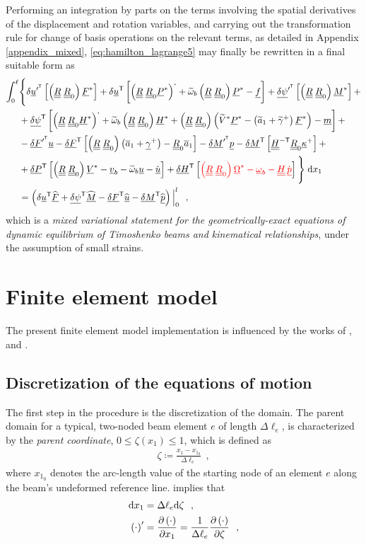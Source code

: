 \documentclass[12pt,a4paper,oneside,english]{abntex2} %
\newcommand{\fix}[1]{{\color{red}#1}}
\newcommand{\vect}[1]{\underline{#1}}
\newcommand{\uvec}[1]{\overline{#1}}
\newcommand{\del}[2]{\frac{\partial#1}{\partial#2}}
\def\tens#1{\underline{\underline{#1}}}
\def\til#1{\widetilde{#1}}
\def\lb{\left[}
\def\rb{\right]}
\def\lp{\left(}
\def\rp{\right)}
\def\T{\mathsf{T}}
\def\xo{x_1}
\def\aone{\uvec{a}_1}
\def\aonetil{\til{a}_1}
\def\dotout{^{\boldsymbol{\cdot}}}
\def\R{\tens{R}}
\def\Rz{\R_0}
\def\u{\vect{u}}
\def\uT{\u^\T}
\def\udot{\dot{\u}}
\def\uprimeT{\u^{\prime^\T}}
\def\uhat{\widehat{\u}}
\def\vb{\vect{v}_b}
\def\om{\vect{\omega}_b}
\def\omtil{\til{\omega}_b}
\def\gam{\vect{\gamma}}
\def\gamp{\gam^{+}}
\def\gamptil{\til{\gamma}^{+}}
\def\kap{\vect{\kappa}}
\def\kapp{\kap^{+}}
\def\V{\vect{V}}
\def\Vs{\V^{*}}
\def\Vtils{\til{V}^{*}}
\def\Om{\vect{\Omega}}
\def\Oms{\Om^{*}}
\def\P{\vect{P}}
\def\Ps{\P^*}
\def\Hv{\vect{H}}
\def\Hvs{\Hv^*}
\def\H{\tens{H}}
\def\HinvT{\H^{-\T}}
\def\p{\vect{p}}
\def\pdot{\dot{\p}}
\def\phat{\widehat{\p}}
\def\F{\vect{F}}
\def\Fhat{\widehat{\F}}
\def\Fs{\F^*}
\def\M{\vect{M}}
\def\Mhat{\widehat{\M}}
\def\Ms{\M^*}
\def\f{\vect{f}}
\def\m{\vect{m}}
\def\delF{\vect{\delta F}}
\def\delFT{\delF^\T}
\def\delFpT{\delF^{\prime^\T}}
\def\delM{\vect{\delta M}}
\def\delMT{\delM^\T}
\def\delMpT{\delM^{\prime^\T}}
\def\delP{\vect{\delta P}}
\def\delPT{\delP^\T}
\def\delH{\vect{\delta H}}
\def\delHT{\delH^\T}
\def\delpsi{\vect{\delta\psi}}
\def\delpsiT{\delpsi^\T}
\def\delpsipT{\delpsi^{\prime^\T}}
\def\Deltal{\Delta \ell_e}
\def\Deltalinv{\frac{1}{\Deltal}}
\def\intl{\int_{0}^{\ell}}
\def\d{\textnormal{d}}
\def\RRz{\lp\R\;\Rz\rp}
\def\xoz{x_{1_0}}
\begin{document}
Performing an integration by parts on the terms involving the spatial derivatives of the displacement and rotation variables, and carrying out the transformation rule for change of basis operations on the relevant terms, as detailed in Appendix \ref{appendix_mixed}, \cref{eq:hamilton_lagrange5} may finally be rewritten in a final suitable form as
\begin{align}
	\intl &\Biggl\{\Biggr. \delta\uprimeT\lb\RRz\Fs\rb + \delta\uT\lb\lp\R\;\Rz\Ps\rp\dotout+\omtil\RRz\Ps-\f\rb + \delpsipT\lb\RRz\Ms\rb +
	\nonumber \\	&+\delpsiT\lb\lp\R\;\Rz\Hvs\rp\dotout+\omtil\RRz\Hvs+\RRz\lp\Vtils\Ps-\lp\aonetil+\gamptil\rp\Fs\rp-\m\rb + \nonumber \\
	&-\delFpT\u -\delFT\lb\RRz\lp\aone+\gamp\rp-\Rz\aone\rb - \delMpT\p -\delMT\lb\HinvT\Rz\kapp\rb +
	\nonumber \\
	&+\delPT\lb\RRz\Vs-\vb-\omtil\u-\udot\rb + \delHT\lb\fix{\RRz\Oms-\om-\H\,\pdot}\rb
	\Biggl.\Biggr\}\;\d \xo \nonumber \\
	&=\lp \delta\uT\Fhat+\delpsiT\Mhat-\delFT\uhat-\delMT\phat \rp\Big|_{0}^{l} \ \ ,
    \label{eq:hamilton_lagrange6}
\end{align}
which is a \textit{mixed variational statement for the geometrically-exact equations of dynamic equilibrium of Timoshenko beams and kinematical relationships}, under the assumption of small strains.

\section{ Finite element model}
\label{sec:fem}

The present finite element model implementation is influenced by the works of , and . 

\subsection{Discretization of the equations of motion}

The first step in the procedure is the discretization of the domain. The parent domain for a typical, two-noded beam element $e$ of length $\Deltal$, is characterized by the \textit{parent coordinate}, $0\leq\zeta(\xo)\leq1$, which is defined as
\begin{align}
    \zeta \coloneqq \frac{\xo-\xoz}{\Deltal} \ \ ,
    \label{eq:zeta}
\end{align}
where $\xoz$ denotes the arc-length value of the starting node of an element $e$ along the beam's undeformed reference line.  implies that 
\begin{equation}
    \begin{aligned}
        \d \xo &= \Deltal\d\zeta \ \ ,
        \\
        \lp\cdot\rp^\prime &= \del{\lp\cdot\rp}{\xo} = \Deltalinv\del{\lp\cdot\rp}{\zeta} \ \ ,
        \label{eq:ddx1}
    \end{aligned}
\end{equation}
\end{document}
